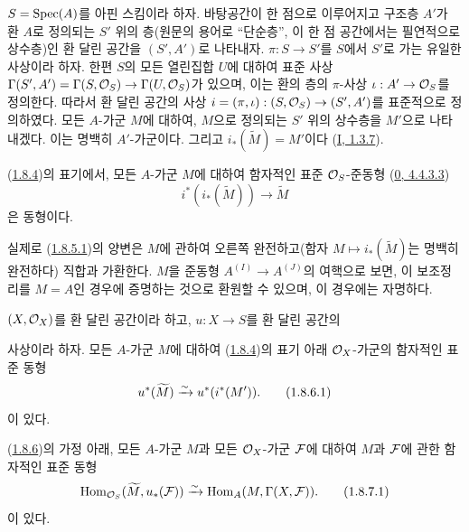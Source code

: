 \begin{env}[1.8.4]
\label{ega2:addendum:I.1.8.4-ko}
$S=\operatorname{Spec}(A)$를 아핀 스킴이라 하자. 바탕공간이 한 점으로 이루어지고
구조층 $A'$가 환 $A$로 정의되는 $S'$ 위의 층(원문의 용어로 ``단순층'',
이 한 점 공간에서는 필연적으로 상수층)인
환 달린 공간을 $(S',A')$로 나타내자. $\pi:S\to S'$를 $S$에서 $S'$로
가는 유일한 사상이라 하자. 한편 $S$의 모든 열린집합 $U$에 대하여
표준 사상
$\Gamma(S',A')=\Gamma(S,\mathcal{O}_S)\to\Gamma(U,\mathcal{O}_S)$가 있으며,
이는 환의 층의 $\pi$-사상 $\iota:A'\to\mathcal{O}_S$를 정의한다. 따라서
환 달린 공간의 사상
$i=(\pi,\iota):(S,\mathcal{O}_S)\to(S',A')$를 표준적으로 정의하였다.
모든 $A$-가군 $M$에 대하여, $M$으로 정의되는 $S'$ 위의 상수층을
$M'$으로 나타내겠다. 이는 명백히 $A'$-가군이다. 그리고
$i_*(\widetilde M)=M'$이다
(\hyperref[I.1.3.7-ko]{I, 1.3.7}).
\end{env}

\begin{lemma}[1.8.5]
\label{ega2:addendum:I.1.8.5-ko}
(\hyperref[ega2:addendum:I.1.8.4-ko]{1.8.4})의 표기에서, 모든
$A$-가군 $M$에 대하여 함자적인 표준 $\mathcal{O}_S$-준동형
(\hyperref[0.4.4.3.3-ko]{0, 4.4.3.3})
\begin{equation}
\label{ega2:addendum:I.1.8.5.1-ko}
  i^*(i_*(\widetilde M))\to\widetilde M
\tag{1.8.5.1}
\end{equation}
은 동형이다.
\end{lemma}

실제로 (\hyperref[ega2:addendum:I.1.8.5.1-ko]{1.8.5.1})의 양변은
$M$에 관하여 오른쪽 완전하고(함자 $M\mapsto i_*(\widetilde M)$는
명백히 완전하다) 직합과 가환한다. $M$을 준동형
$A^{(I)}\to A^{(J)}$의 여핵으로 보면, 이 보조정리를 $M=A$인 경우에
증명하는 것으로 환원할 수 있으며, 이 경우에는 자명하다.

\begin{corollary}[1.8.6]
\label{ega2:addendum:I.1.8.6-ko}
$(X,\mathcal{O}_X)$를 환 달린 공간이라 하고, $u:X\to S$를 환 달린 공간의
사상이라 하자. 모든 $A$-가군 $M$에 대하여
(\hyperref[ega2:addendum:I.1.8.4-ko]{1.8.4})의 표기 아래
$\mathcal{O}_X$-가군의 함자적인 표준 동형
\begin{equation}
\label{ega2:addendum:I.1.8.6.1-ko}
  u^*(\widetilde M)\xrightarrow{\sim} u^*(i^*(M')).
\tag{1.8.6.1}
\end{equation}
이 있다.
\end{corollary}

\begin{corollary}[1.8.7]
\label{ega2:addendum:I.1.8.7-ko}
(\hyperref[ega2:addendum:I.1.8.6-ko]{1.8.6})의 가정 아래, 모든
$A$-가군 $M$과 모든 $\mathcal{O}_X$-가군 $\mathcal{F}$에 대하여 $M$과
$\mathcal{F}$에 관한 함자적인 표준 동형
\begin{equation}
\label{ega2:addendum:I.1.8.7.1-ko}
  \operatorname{Hom}_{\mathcal{O}_S}(\widetilde M,u_*(\mathcal{F}))
  \xrightarrow{\sim}\operatorname{Hom}_A(M,\Gamma(X,\mathcal{F})).
\tag{1.8.7.1}
\end{equation}
이 있다.
\end{corollary}

